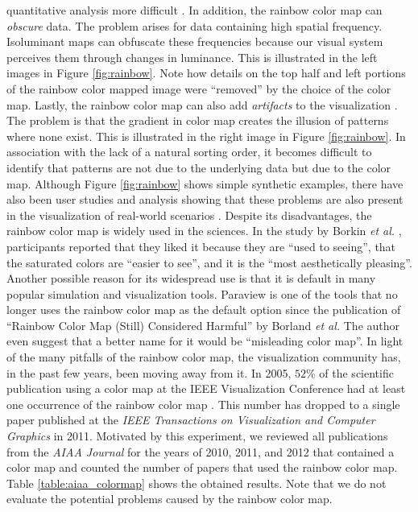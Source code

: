 quantitative analysis more difficult \cite{Borland:2007:RCM:1251554.1251614}.  
%
In addition, the rainbow color map can \emph{obscure} data. The problem arises 
for data containing high spatial frequency. Isoluminant maps can obfuscate these frequencies 
because our visual system perceives them through changes in luminance. 
%
This is illustrated in the left images in Figure \ref{fig:rainbow}.
%
Note how details on the top half and left portions of the rainbow color mapped image  were ``removed'' by the choice of the color map.
%
Lastly, the rainbow color map can also add \emph{artifacts} to the visualization \cite{treinishshould}. 
The problem is that the gradient in color map creates the illusion of patterns where none exist. This 
is illustrated in the right image in Figure \ref{fig:rainbow}. In association with the lack of a natural sorting order, 
it becomes difficult to identify that patterns are not due to the underlying data but due to the color map. 
%
Although Figure \ref{fig:rainbow} shows simple synthetic examples, there have also been user studies and 
analysis showing that these problems are also present in the visualization of real-world scenarios \cite{treinishshould}.
%
Despite its disadvantages, the rainbow color map is widely used in the sciences. In the study by Borkin 
\emph{et al.} \cite{305}, participants reported that they liked it because they are ``used to seeing'', that 
the saturated colors are ``easier to see'', and it is the ``most aesthetically pleasing''. 
%
Another possible reason  for its widespread use is that it is default in many popular simulation and 
visualization tools. Paraview is one of the tools that no longer uses the rainbow color map as the
default option since the publication of ``Rainbow Color Map (Still) Considered 
Harmful'' \cite{paraview} by Borland \emph{et al.} The author even suggest that a better name for it would be ``misleading color map''.
%
In light of the many pitfalls of the rainbow color map, the visualization community has, in the past few 
years, been moving away from it. 
%
In 2005, $52\%$ of the scientific publication using a color map at the IEEE Visualization Conference 
had at least one occurrence of the rainbow color map \cite{Borland:2007:RCM:1251554.1251614}. 
This number has dropped to a single paper published at the {\em IEEE Transactions on Visualization and 
Computer Graphics} in 2011. Motivated by this experiment, we reviewed all publications from the 
{\em AIAA Journal} for the years of 2010, 2011, and 2012 that contained a color map and counted the number of papers that used the rainbow color map. Table \ref{table:aiaa_colormap} shows the obtained results. Note that we do not evaluate the potential problems caused by the rainbow color map. 

